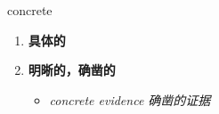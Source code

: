 
\begin{frame}
{\huge concrete}
\begin{center}
\begin{enumerate}\Large
  \item \textbf{具体的}
  \item \textbf{明晰的，确凿的}
  \begin{itemize}
    \item \em{\Large{concrete evidence 确凿的证据}}
  \end{itemize}
\end{enumerate}
\end{center}
\end{frame}

